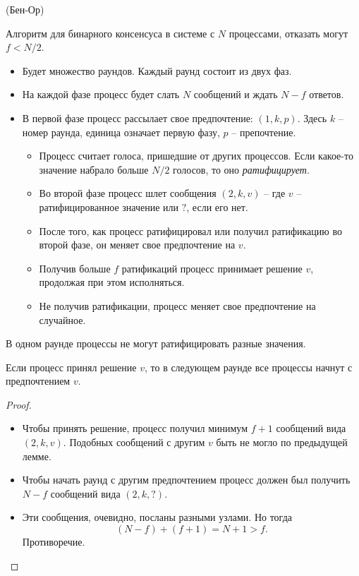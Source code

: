 \begin{algorithm}(Бен-Ор)

    Алгоритм для бинарного консенсуса в системе с $N$ процессами, отказать могут $f < N / 2$.
    \begin{itemize}
        \item Будет множество раундов. Каждый раунд состоит из двух фаз.
        \item На каждой фазе процесс будет слать $N$ сообщений и ждать
            $N - f$ ответов.
        \item В первой фазе процесс рассылает свое предпочтение:
            $(1, k, p)$. Здесь $k$ -- номер раунда, единица означает
            первую фазу, $p$ -- препочтение.
            \begin{itemize}
                \item Процесс считает голоса, пришедшие от других процессов.
                    Если какое-то значение набрало больше $N/2$ голосов,
                    то оно \textit{ратифицирует}.
                \item Во второй фазе процесс шлет сообщения $(2, k, v)$ --
                    где $v$ -- ратифицированное значение или $?$, если
                    его нет.
                \item После того, как процесс ратифицировал или получил
                    ратификацию во второй фазе, он меняет свое предпочтение на $v$.
                \item Получив больше $f$ ратификаций процесс принимает решение $v$,
                    продолжая при этом исполняться.
                \item Не получив ратификации, процесс меняет свое предпочтение
                    на случайное.
            \end{itemize}
    \end{itemize}
\end{algorithm}

\begin{lemma}
    В одном раунде процессы не могут ратифицировать разные значения.
\end{lemma}

\begin{lemma}
    Если процесс принял решение $v$, то в следующем раунде все процессы
    начнут с предпочтением $v$.
\end{lemma}
\begin{proof}
    \enewline
    \begin{itemize}
        \item Чтобы принять решение, процесс получил минимум $f + 1$
            сообщений вида $(2, k, v)$. Подобных сообщений с другим
            $v$ быть не могло по предыдущей лемме.
        \item Чтобы начать раунд с другим предпочтением процесс должен был
            получить $N - f$ сообщений вида $(2, k, ?)$.
        \item Эти сообщения, очевидно, посланы разными узлами. Но тогда
            \[
                (N - f) + (f + 1) = N + 1 > f
            .\]
            Противоречие.
    \end{itemize}
\end{proof}


